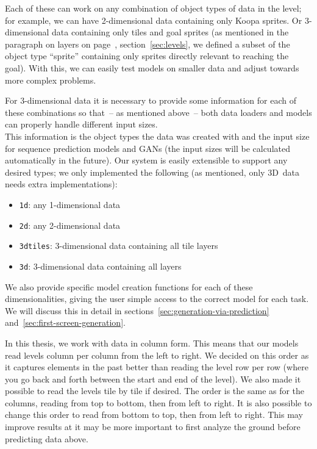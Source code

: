Each of these can work on any combination of object types of data in
the level; for example, we can have 2-dimensional data containing only
Koopa sprites. Or 3-dimensional data containing only tiles and goal
sprites (as mentioned in the paragraph on layers on
page~\pageref{par:layers}, section~\ref{sec:levels}, we defined a
subset of the object type ``sprite'' containing only sprites directly
relevant to reaching the goal). With this, we can easily test models
on smaller data and adjust towards more complex problems.

For 3-dimensional data it is necessary to provide some information for
each of these combinations so that~-- as mentioned above~-- both data
loaders and models can properly handle different input sizes. \\
This information is the object types the data was created with and the
input size for sequence prediction models and GANs (the input sizes
will be calculated automatically in the future). Our system is easily
extensible to support any desired types; we only implemented the
following (as mentioned, only 3D~data needs extra implementations):
\begin{itemize}
\item \texttt{1d}: any 1-dimensional data
\item \texttt{2d}: any 2-dimensional data
\item \texttt{3dtiles}: 3-dimensional data containing all tile layers
\item \texttt{3d}: 3-dimensional data containing all layers
\end{itemize}
We also provide specific model creation functions for each of these
dimensionalities, giving the user simple access to the correct model
for each task. We will discuss this in detail in
sections~\ref{sec:generation-via-prediction}
and~\ref{sec:first-screen-generation}.

In this thesis, we work with data in column form. This means that our
models read levels column per column from the left to right. We
decided on this order as it captures elements in the past better than
reading the level row per row (where you go back and forth between the
start and end of the level). We also made it possible to read the
levels tile by tile if desired. The order is the same as for the
columns, reading from top to bottom, then from left to right. It is
also possible to change this order to read from bottom to top, then
from left to right. This may improve results at it may be more
important to first analyze the ground before predicting data above.

